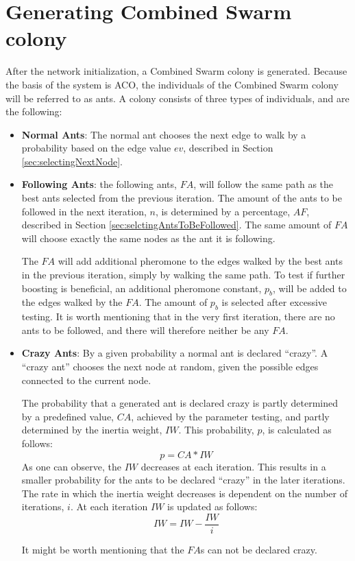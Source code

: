 \section{Generating Combined Swarm colony}
\label{sec:algoGeneratingSuperSwarm}
After the network initialization, a Combined Swarm colony is generated. Because the basis of the system is ACO, the individuals of the Combined Swarm colony will be referred to as ants. A colony consists of three types of individuals, and are the following: 

\begin{itemize}
\item \textbf{Normal Ants}: The normal ant chooses the next edge to walk by a probability based on the edge value $ev$, described in Section \vref{sec:selectingNextNode}.

\item \textbf{Following Ants}: the following ants, $FA$, will follow the same path as the best ants selected from the previous iteration. The amount of the ants to be followed in the next iteration, $n$, is determined by a percentage, $AF$, described in Section \vref{sec:selctingAntsToBeFollowed}. The same amount of $FA$ will choose exactly the same nodes as the ant it is following.

The $FA$ will add additional pheromone to the edges walked by the best ants in the previous iteration, simply by walking the same path. To test if further boosting is beneficial, an additional pheromone constant, $p_b$, will be added to the edges walked by the $FA$. The amount of $p_b$ is selected after excessive testing. It is worth mentioning that in the very first iteration, there are no ants to be followed, and there will therefore neither be any $FA$.  

\item \textbf{Crazy Ants}: By a given probability a normal ant is declared ``crazy''. A ``crazy ant'' chooses the next node at random, given the possible edges connected to the current node. 

The probability that a generated ant is declared crazy is partly determined by a predefined value, $CA$, achieved by the parameter testing, and partly determined by the inertia weight, $IW$. This probability, $p$, is calculated as follows:
$$p = CA*IW$$
As one can observe, the $IW$ decreases at each iteration. This results in a smaller probability for the ants to be declared ``crazy'' in the later iterations. The rate in which the inertia weight decreases is dependent on the number of iterations, $i$. At each iteration $IW$ is updated as follows:
$$IW = IW - \frac{IW}{i}$$

It might be worth mentioning that the $FA$s can not be declared crazy. 

\end{itemize}
